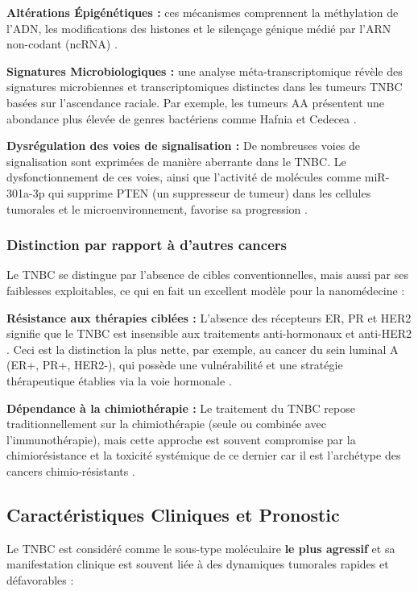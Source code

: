 \textbf{Altérations Épigénétiques :} ces mécanismes comprennent la méthylation de l'ADN, les modifications des histones et le silençage génique médié par l'ARN non-codant (ncRNA)  \cite{Go2025}.

\textbf{Signatures Microbiologiques :} une analyse méta-transcriptomique révèle des signatures microbiennes et transcriptomiques distinctes dans les tumeurs TNBC basées sur l'ascendance raciale. Par exemple, les tumeurs AA présentent une abondance plus élevée de genres bactériens comme Hafnia et Cedecea \cite{Kumar2025a}.

\textbf{Dysrégulation des voies de signalisation :} De nombreuses voies de signalisation sont exprimées de manière aberrante dans le TNBC. Le dysfonctionnement de ces voies, ainsi que l'activité de molécules comme miR-301a-3p qui supprime PTEN (un suppresseur de tumeur) dans les cellules tumorales et le microenvironnement, favorise sa progression  \cite{Lin2025}.

\subsubsection{Distinction par rapport à d'autres cancers}
Le TNBC se distingue par l'absence de cibles conventionnelles, mais aussi par ses faiblesses exploitables, ce qui en fait un excellent modèle pour la nanomédecine \cite{Ma2025, Chuang2025}:

\textbf{Résistance aux thérapies ciblées :} L'absence des récepteurs ER, PR et HER2 signifie que le TNBC est insensible aux traitements anti-hormonaux et anti-HER2  \cite{Ma2025, Paulson2025}. Ceci est la distinction la plus nette, par exemple, au cancer du sein luminal A (ER+, PR+, HER2-), qui possède une vulnérabilité et une stratégie thérapeutique établies via la voie hormonale \cite{Lebedeva2025}.

\textbf{Dépendance à la chimiothérapie :} Le traitement du TNBC repose traditionnellement sur la chimiothérapie (seule ou combinée avec l'immunothérapie), mais cette approche est souvent compromise par la chimiorésistance et la toxicité systémique de ce dernier car il est l'archétype des cancers chimio-résistants \cite{Ma2025, Gao2024}.

\subsection{Caractéristiques Cliniques et Pronostic}
Le TNBC est considéré comme le sous-type moléculaire \textbf{le plus agressif} et sa manifestation clinique est souvent liée à des dynamiques tumorales rapides et défavorables \cite{Ailioaie2025, Go2025, Ma2025, Sun2020} :

